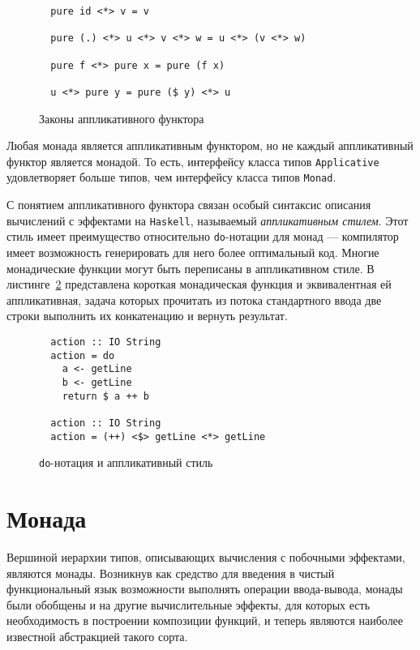   \begin{figure}[h]
  \begin{lstlisting}
  pure id <*> v = v

  pure (.) <*> u <*> v <*> w = u <*> (v <*> w)

  pure f <*> pure x = pure (f x)

  u <*> pure y = pure ($ y) <*> u
  \end{lstlisting}
  \caption{Законы аппликативного функтора}
  \label{listing:ApplicativeLaws}
  \end{figure}

  Любая монада является аппликативным функтором, но не каждый аппликативный
  функтор является монадой. То есть, интерфейсу класса типов
  \lstinline{Applicative} удовлетворяет больше типов, чем интерфейсу класса типов
  \lstinline{Monad}.

  С понятием аппликативного функтора связан особый синтаксис описания вычислений с
  эффектами на \lstinline{Haskell}, называемый \emph{аппликативным стилем}. Этот
  стиль имеет преимущество относительно \lstinline{do}-нотации для монад ---
  компилятор имеет возможность генерировать для него более оптимальный код.
  Многие монадические функции могут быть переписаны в аппликативном стиле.
  В листинге~\ref{listing:MonadApplicative} представлена короткая монадическая
  функция и эквивалентная ей аппликативная, задача которых прочитать из потока
  стандартного ввода две строки выполнить их конкатенацию и вернуть результат.

  \begin{figure}
  \begin{lstlisting}
  action :: IO String
  action = do
    a <- getLine
    b <- getLine
    return $ a ++ b

  action :: IO String
  action = (++) <$> getLine <*> getLine
  \end{lstlisting}
  \caption{\lstinline{do}-нотация и аппликативный стиль}
  \label{listing:MonadApplicative}
  \end{figure}

\section{Монада}

  Вершиной иерархии типов, описывающих вычисления с побочными эффектами,
  являются монады. Возникнув как средство для введения в чистый функциональный
  язык возможности выполнять операции ввода-вывода, монады были обобщены и на
  другие вычислительные эффекты, для которых есть необходимость в построении
  композиции функций, и теперь являются наиболее известной абстракцией такого
  сорта.

